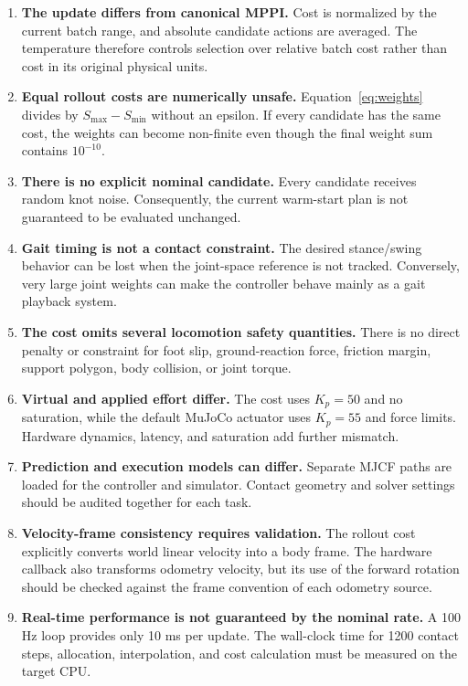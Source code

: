 \documentclass[11pt,a4paper]{article}
\begin{document}
\begin{enumerate}
  \item \textbf{The update differs from canonical MPPI.}
  Cost is normalized by the current batch range, and absolute candidate
  actions are averaged.  The temperature therefore controls selection over
  relative batch cost rather than cost in its original physical units.

  \item \textbf{Equal rollout costs are numerically unsafe.}
  Equation~\eqref{eq:weights} divides by $S_{\max}-S_{\min}$ without an
  epsilon.  If every candidate has the same cost, the weights can become
  non-finite even though the final weight sum contains $10^{-10}$.

  \item \textbf{There is no explicit nominal candidate.}
  Every candidate receives random knot noise.  Consequently, the current
  warm-start plan is not guaranteed to be evaluated unchanged.

  \item \textbf{Gait timing is not a contact constraint.}
  The desired stance/swing behavior can be lost when the joint-space reference
  is not tracked.  Conversely, very large joint weights can make the
  controller behave mainly as a gait playback system.

  \item \textbf{The cost omits several locomotion safety quantities.}
  There is no direct penalty or constraint for foot slip, ground-reaction
  force, friction margin, support polygon, body collision, or joint torque.

  \item \textbf{Virtual and applied effort differ.}
  The cost uses $K_p=50$ and no saturation, while the default MuJoCo actuator
  uses $K_p=55$ and force limits.  Hardware dynamics, latency, and saturation
  add further mismatch.

  \item \textbf{Prediction and execution models can differ.}
  Separate MJCF paths are loaded for the controller and simulator.  Contact
  geometry and solver settings should be audited together for each task.

  \item \textbf{Velocity-frame consistency requires validation.}
  The rollout cost explicitly converts world linear velocity into a body
  frame.  The hardware callback also transforms odometry velocity, but its use
  of the forward rotation should be checked against the frame convention of
  each odometry source.

  \item \textbf{Real-time performance is not guaranteed by the nominal rate.}
  A 100 Hz loop provides only 10 ms per update.  The wall-clock time for 1200
  contact steps, allocation, interpolation, and cost calculation must be
  measured on the target CPU.
\end{enumerate}
\end{document}
